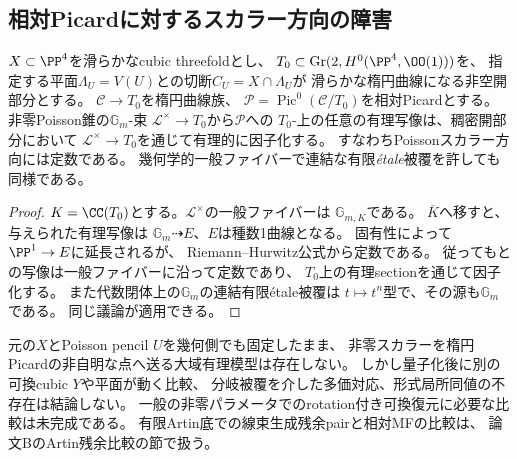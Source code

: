 \subsection{相対Picardに対するスカラー方向の障害}
\begin{proposition}\label{prop:relative-scalar-picard}
$X\subset\PP^4$を滑らかなcubic threefoldとし、
$T_0\subset\operatorname{Gr}(2,H^0(\PP^4,\OO(1)))$を、
指定する平面$\Lambda_U=V(U)$との切断$C_U=X\cap\Lambda_U$が
滑らかな楕円曲線になる非空開部分とする。
$\mathscr C\to T_0$を楕円曲線族、
$\mathscr P=\operatorname{Pic}^0(\mathscr C/T_0)$を相対Picardとする。
非零Poisson錐の$\mathbb G_m$-束
$\mathscr L^\times\to T_0$から$\mathscr P$への
$T_0$-上の任意の有理写像は、稠密開部分において
$\mathscr L^\times\to T_0$を通じて有理的に因子化する。
すなわちPoissonスカラー方向には定数である。
幾何学的一般ファイバーで連結な有限\emph{étale}被覆を許しても同様である。
\end{proposition}
\begin{proof}
$K=\CC(T_0)$とする。$\mathscr L^\times$の一般ファイバーは
$\mathbb G_{m,K}$である。
$\overline K$へ移すと、与えられた有理写像は
$\mathbb G_m\dashrightarrow E$、$E$は種数1曲線となる。
固有性によって$\PP^1\to E$に延長されるが、
Riemann--Hurwitz公式から定数である。
従ってもとの写像は一般ファイバーに沿って定数であり、
$T_0$上の有理sectionを通じて因子化する。
また代数閉体上の$\mathbb G_m$の連結有限étale被覆は
$t\mapsto t^n$型で、その源も$\mathbb G_m$である。
同じ議論が適用できる。
\end{proof}
\begin{remark}[復元への含意と限界]
元の$X$とPoisson pencil $U$を幾何側でも固定したまま、
非零スカラーを楕円Picardの非自明な点へ送る大域有理模型は存在しない。
しかし量子化後に別の可換cubic $Y$や平面が動く比較、
分岐被覆を介した多価対応、形式局所同値の不存在は結論しない。
一般の非零パラメータでのrotation付き可換復元に必要な比較は未完成である。
有限Artin底での線束生成残余pairと相対MFの比較は、
論文BのArtin残余比較の節で扱う。
\end{remark}
